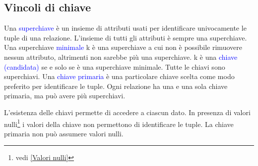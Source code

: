 \subsection{Vincoli di chiave}

\label{Vincoli di chiave}

Una \textcolor{blue}{superchiave} è un insieme di attributi usati per identificare univocamente le tuple di una relazione. L'insieme di tutti gli attributi è sempre una superchiave. Una superchiave \textcolor{blue}{minimale} k è una superchiave a cui non è possibile rimuovere nessun attributo, altrimenti non sarebbe più una superchiave. k è una \textcolor{blue}{chiave (candidata)} se e solo se è una superchiave minimale. Tutte le chiavi sono superchiavi. Una \textcolor{blue}{chiave primaria} è una particolare chiave scelta come modo preferito per identificare le tuple. Ogni relazione ha una e una sola chiave primaria, ma può avere più superchiavi.

L'esistenza delle chiavi permette di accedere a ciascun dato. In presenza di valori nulli\footnote{vedi \ref{Valori nulli}} i valori della chiave non permettono di identificare le tuple. La chiave primaria non può assumere valori nulli.